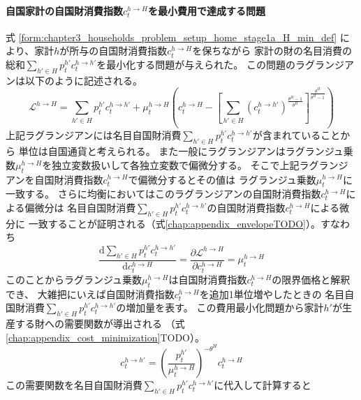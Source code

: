 \paragraph{自国家計の自国財消費指数\(c_t^{h\to H}\)を最小費用で達成する問題}
\label{sec:chapter3_households_stage1a_home_c_h_H_problem}
式
\eqref{form:chapter3_households_problem_setup_home_stage1a_H_min_def}
により、家計\(h\)が所与の自国財消費指数\(c_t^{h\to H}\)を保ちながら
家計の財の名目消費の総和\(\sum_{h'\in H}p_t^{h'}c_t^{h\to h'}\)を最小化する問題が与えられた。
この問題のラグランジアンは以下のように記述される。
\begin{equation}
\label{form:chapter3_households_stage1a_home_c_h_H_problem_lagrangian_def}
    \mathcal{L}^{h\to H}=\sum_{h'\in H}p_t^{h'}c_t^{h\to h'}+\mu_t^{h\to H}\left(c_t^{h\to H}-\left[\sum_{h'\in H}(c_t^{h\to h'})^{\frac{\theta^H-1}{\theta^H}}\right]^{\frac{\theta^H}{\theta^H-1}}\right)
\end{equation}
上記ラグランジアンには名目自国財消費\(\sum_{h'\in H}p_t^{h'}c_t^{h\to h'}\)が含まれていることから
単位は自国通貨と考えられる。
また一般にラグランジアンはラグランジュ乗数\(\mu_t^{h\to H}\)を独立変数扱いして各独立変数で偏微分する。
そこで上記ラグランジアンを自国財消費指数\(c_t^{h\to H}\)で偏微分するとその値は
ラグランジュ乗数\(\mu_t^{h\to H}\)に一致する。
さらに均衡においてはこのラグランジアンの自国財消費指数\(c_t^{h\to H}\)による偏微分は
名目自国財消費\(\sum_{h'\in H}p_t^{h'}c_t^{h\to h'}\)の自国財消費指数\(c_t^{h\to H}\)による微分に
一致することが証明される（式\eqref{chap:appendix_envelopeTODO}）。すなわち
\begin{equation}
\label{form:chapter3_households_stage1a_home_c_h_H_problem_mu_h_H_marginal_eq}
    \frac{\mathrm{d}\sum_{h'\in H}p_t^{h'}c_t^{h\to h'}}{\mathrm{d}c_t^{h\to H}}=\frac{\partial \mathcal{L}^{h\to H}}{\partial c_t^{h\to H}}=\mu_t^{h\to H}
\end{equation}
このことからラグランジュ乗数\(\mu_t^{h\to H}\)は自国財消費指数\(c_t^{h\to H}\)の限界価格と解釈でき、
大雑把にいえば自国財消費指数\(c_t^{h\to H}\)を追加1単位増やしたときの
名目自国財消費\(\sum_{h'\in H}p_t^{h'}c_t^{h\to h'}\)の増加量を表す。
この費用最小化問題から家計\(h'\)が生産する財への需要関数が導出される
（式\eqref{chap:appendix_cost_minimization}TODO）。
\begin{equation}
\label{form:chapter3_households_stage1a_home_c_h_H_problem_c_h_h_eq}
    c_t^{h\to h'}=\left(\frac{p_t^{h'}}{\mu_t^{h\to H}}\right)^{-\theta^H}c_t^{h\to H}
\end{equation}
この需要関数を名目自国財消費\(\sum_{h'\in H}p_t^{h'}c_t^{h\to h'}\)に代入して計算すると
